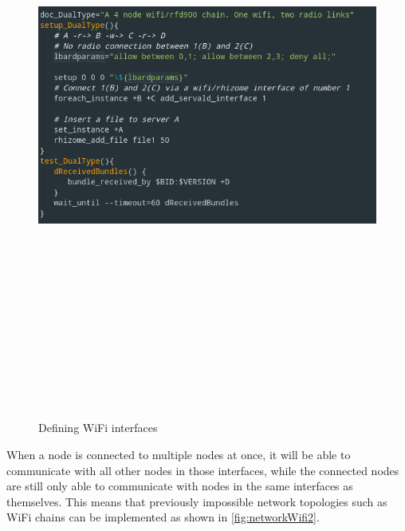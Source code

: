 \begin{figure}
    \begin{centering}
        \includegraphics[width=14cm,height=20cm,keepaspectratio]{Figures/definingInterfaces.png}
        \caption{Defining WiFi interfaces}
        \label{fig:definingInterfaces}
    \end{centering}
\end{figure}
When a node is connected to multiple nodes at once, it will be able to communicate with all other nodes in those interfaces, while the connected nodes are still only able to communicate with nodes in the same interfaces as themselves.
This means that previously impossible network topologies such as WiFi chains can be implemented as shown in \figurename{ \ref{fig:networkWifi2}}.

